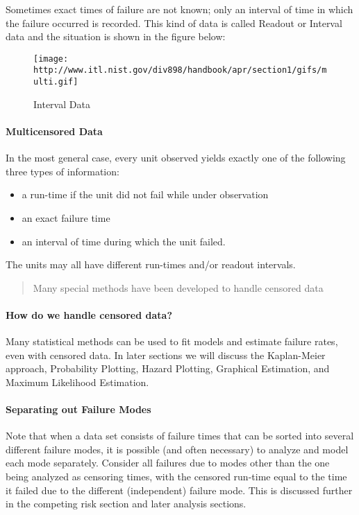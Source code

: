 \documentclass[]{book}
\providecommand{\tightlist}{%
  \setlength{\itemsep}{0pt}\setlength{\parskip}{0pt}}
\let\oldparagraph\paragraph
\renewcommand{\paragraph}[1]{\oldparagraph{#1}\mbox{}}
\theoremstyle{definition}
\theoremstyle{definition}
\theoremstyle{definition}
\theoremstyle{remark}
\begin{document}
Sometimes exact times of failure are not known; only an interval of time
in which the failure occurred is recorded. This kind of data is called
Readout or Interval data and the situation is shown in the figure below:

\begin{figure}
\centering
\texttt{[image: http://www.itl.nist.gov/div898/handbook/apr/section1/gifs/multi.gif]}
\caption{Interval Data}
\end{figure}

\paragraph{Multicensored Data}\label{multicensored-data}

In the most general case, every unit observed yields exactly one of the
following three types of information:

\begin{itemize}
\tightlist
\item
  a run-time if the unit did not fail while under observation
\item
  an exact failure time
\item
  an interval of time during which the unit failed.
\end{itemize}

The units may all have different run-times and/or readout intervals.

\begin{quote}
Many special methods have been developed to handle censored data
\end{quote}

\paragraph{How do we handle censored
data?}\label{how-do-we-handle-censored-data}

Many statistical methods can be used to fit models and estimate failure
rates, even with censored data. In later sections we will discuss the
Kaplan-Meier approach, Probability Plotting, Hazard Plotting, Graphical
Estimation, and Maximum Likelihood Estimation.

\paragraph{Separating out Failure
Modes}\label{separating-out-failure-modes}

Note that when a data set consists of failure times that can be sorted
into several different failure modes, it is possible (and often
necessary) to analyze and model each mode separately. Consider all
failures due to modes other than the one being analyzed as censoring
times, with the censored run-time equal to the time it failed due to the
different (independent) failure mode. This is discussed further in the
competing risk section and later analysis sections.
\end{document}
